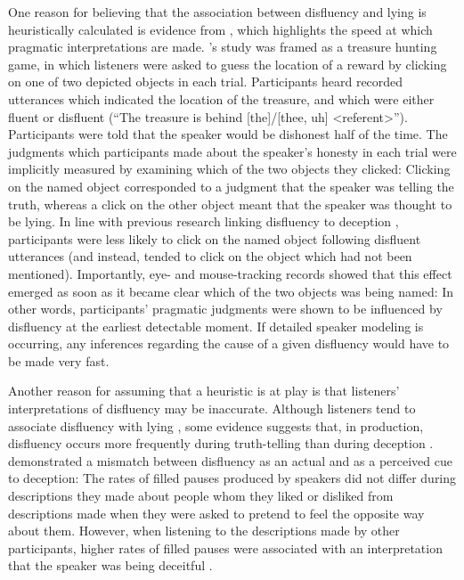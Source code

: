 \documentclass[a4paper,man,natbib]{apa6}
\newcommand*{\spex}[1]{``{#1}''} %
\begin{document}
One reason for believing that the association between disfluency and lying is heuristically calculated is evidence from \citet{Loy2016}, which highlights the speed at which pragmatic interpretations are made.
\citeauthor{Loy2016}'s study was framed as a treasure hunting game, in which listeners were asked to guess the location of a reward by clicking on one of two depicted objects in each trial.
Participants heard recorded utterances which indicated the location of the treasure, and which were either fluent or disfluent (\spex{The treasure is behind [the]/[thee, uh] \textless referent\textgreater}).
Participants were told that the speaker would be dishonest half of the time. 
The judgments which participants made about the speaker's honesty in each trial were implicitly measured by examining which of the two objects they clicked:
Clicking on the named object corresponded to a judgment that the speaker was telling the truth, whereas a click on the other object meant that the speaker was thought to be lying.
In line with previous research linking disfluency to deception \citep{Zuckerman1981},  participants were less likely to click on the named object following disfluent utterances (and instead, tended to click on the object which had not been mentioned).
Importantly, eye- and mouse-tracking records showed that this effect emerged as soon as it became clear which of the two objects was being named:
In other words, participants' pragmatic judgments were shown to be influenced by disfluency at the earliest detectable moment.
If detailed speaker modeling is occurring, any inferences regarding the cause of a given disfluency would have to be made very fast.

Another reason for assuming that a heuristic is at play is that listeners' interpretations of disfluency may be inaccurate.
Although listeners tend to associate disfluency with lying \citep{Loy2016,Zuckerman1981}, some evidence suggests that, in production, disfluency occurs more frequently during truth-telling than during deception \citep{Arciuli2010markers,Arciuli2009lies,Benus2006pauses}.
\citet{DePaulo1982actual} demonstrated a mismatch between disfluency as an actual and as a perceived cue to deception:
The rates of filled pauses produced by speakers did not differ during descriptions they made about people whom they liked or disliked from descriptions made when they were asked to pretend to feel the opposite way about them. 
However, when listening to the descriptions made by other participants, higher rates of filled pauses were associated with an interpretation that the speaker was being deceitful \citep[see also][]{loy2016lying}.
\end{document}
